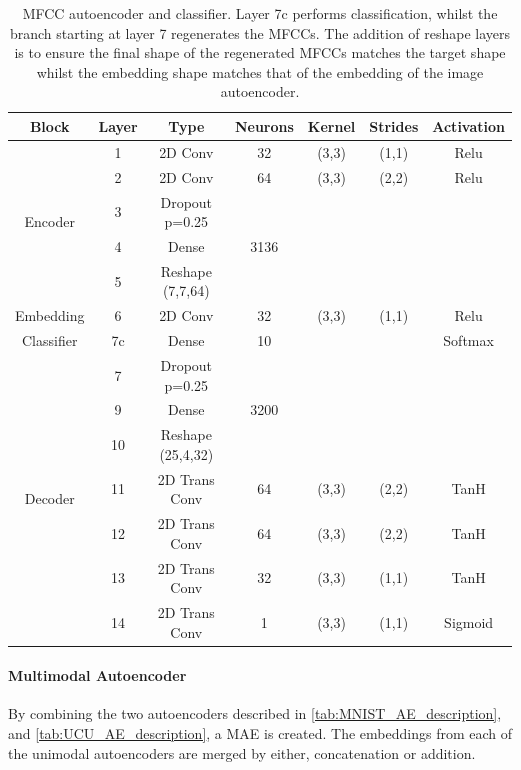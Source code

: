 	\begin{table}[h!]
		\centering
		\begin{tabular}{|c|c|c|c|c|c|c|}
			\hline
			\textbf{Block} & \textbf{Layer} & \textbf{Type} & \textbf{Neurons} & \textbf{Kernel} & \textbf{Strides} & \textbf{Activation}  \\ \hline
			\multirow{5}{*}{Encoder} & 1	&	2D Conv & 32 & (3,3) & (1,1)  & Relu\\ \cline{2-7}
			& 2	&	2D Conv & 64 & (3,3) & (2,2)  & Relu\\ \cline{2-7}
			& 3 	&	Dropout p=0.25 &	 & 	     &        & \\ \cline{2-7}
			& 4	&	Dense          & 3136 & 	 &        & \\ \cline{2-7}
			& 5   &	Reshape (7,7,64) &    &     &        & \\ \hline
			Embedding & 6	&	2D Conv & 32 & (3,3) & (1,1)  & Relu  \\ \hline
			Classifier & 7c	&	Dense          & 10 &       &        & Softmax \\ \hline
			\multirow{7}{*}{Decoder} & 7 	&	Dropout p=0.25 &	 & 	     &        & \\ \cline{2-7}
			& 9	&	Dense			& 3200 &     &        & \\ \cline{2-7}
			& 10	&	Reshape (25,4,32) &    &    &        & \\ \cline{2-7}
			& 11	&	2D Trans Conv & 64 & (3,3) & (2,2)  & TanH \\ \cline{2-7}
			& 12	&	2D Trans Conv & 64 & (3,3) & (2,2)  & TanH \\ \cline{2-7}
			& 13	&	2D Trans Conv & 32 & (3,3) & (1,1)  & TanH \\ \cline{2-7}
			& 14	&	2D Trans Conv & 1 & (3,3) & (1,1) & Sigmoid \\ \hline
		\end{tabular}
		\caption{\ac{MFCC} autoencoder and classifier. Layer 7c performs classification, whilst the branch starting at layer 7 regenerates the \acp{MFCC}. The addition of reshape layers is to ensure the final shape of the regenerated \acp{MFCC} matches the target shape whilst the embedding shape matches that of the embedding of the image autoencoder.}
		\label{tab:UCU_AE_description}
	\end{table}

\paragraph{Multimodal Autoencoder}
By combining the two autoencoders described in \autoref{tab:MNIST_AE_description}, and \autoref{tab:UCU_AE_description}, a \ac{MAE} is created. The embeddings from each of the unimodal autoencoders are merged by either, concatenation or addition.

